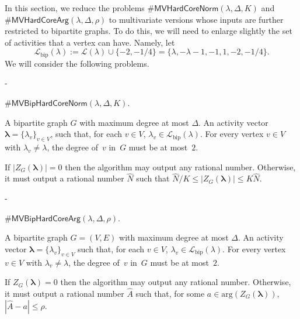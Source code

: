 \documentclass[11pt]{article}
\makeatletter
\renewcommand\arg{\text{arg}}
\def\Lbip{\mathcal{L}_{\mathrm{bip}}}
\def\lambdab{\ensuremath{\boldsymbol{\lambda}}}
\def\FactorMVHardCore#1{\#\ensuremath{\mathsf{MVHardCoreNorm}(\lambda,\Delta,#1)}}
\def\FactorMVBipHardCore#1{\#\ensuremath{\mathsf{MVBipHardCoreNorm}(\lambda,\Delta,#1)}}
\def\ArgMVHardCore#1{\#\ensuremath{\mathsf{MVHardCoreArg}(\lambda,\Delta,#1)}}
\def\ArgMVBipHardCore#1{\#\ensuremath{\mathsf{MVBipHardCoreArg}(\lambda,\Delta,#1)}}
\def\prob#1#2#3{\goodbreak\begin{list}{}{\labelwidth\z@ \itemindent-\leftmargin
                        \itemsep\z@  \topsep6\p@\@plus6\p@
                        \let\makelabel\descriptionlabel}
                \item[\it Name]#1
               \item[\it Instance]                #2
                \item[\it Output]#3
                \end{list}}
\makeatother
\begin{document}
In this section, we reduce the problems $\FactorMVHardCore{K}$ and
$\ArgMVHardCore{\rho}$ to multivariate versions whose inputs are further restricted to bipartite graphs. To do this, we will need to enlarge slightly the set of activities that a vertex can have. Namely, let
\begin{equation}\label{eq:Lbiplam}
\Lbip(\lambda) := \mathcal{L}(\lambda)\cup \{-2,-1/4\}= \{\lambda,-\lambda-1,-1,1,-2,-1/4\}.
\end{equation}
We will consider the following problems.
 \prob{
$\FactorMVBipHardCore{K}$.} { A bipartite graph $G$ with maximum degree at
most $\Delta$. An activity vector $\lambdab=\{\lambda_v\}_{v\in V}$, such that, for each $v\in V$, $\lambda_v \in \Lbip(\lambda)$.
For every vertex $v\in V$ with $\lambda_v\neq \lambda$, the degree of~$v$ in~$G$ must be at most~$2$.} 
{   If $|Z_G(\lambdab)|=0$  then the algorithm may output any rational number. Otherwise,
 it must output a  rational number $\widehat{N}$ such that
$\widehat{N}/K \leq
|Z_{G}(\lambdab)|\leq K \widehat{N}$. }  
 \prob{
$\ArgMVBipHardCore{\rho}$.} {A bipartite graph $G=(V,E)$ with maximum degree at
most $\Delta$. An activity vector $\lambdab=\{\lambda_v\}_{v\in V}$ such that, for each $v\in V$, $\lambda_v \in \Lbip(\lambda)$.
For every vertex $v\in V$ with $\lambda_v\neq \lambda$, the degree of~$v$ in~$G$ must be at most~$2$.
 }
{ If $Z_G(\lambdab)=0$ then the algorithm may output any rational number. Otherwise, it must output  
a rational number $\widehat{A}$ such that, for some $a\in \arg(Z_{G}(\lambdab))$,
$ |\widehat{A} - a| \leq \rho$.  } 
\end{document}
